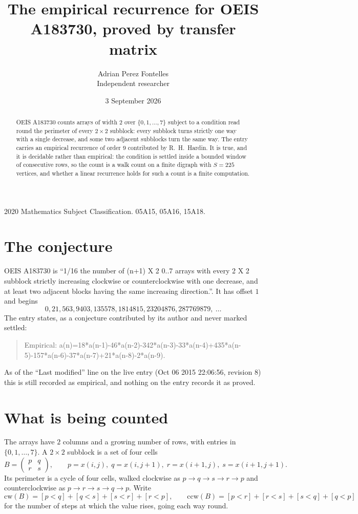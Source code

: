 \documentclass[11pt,a4paper]{article}
\title{The empirical recurrence for OEIS A183730, proved by transfer matrix}
\author{Adrian Perez Fontelles\\ \small Independent researcher}
\date{3 September 2026}
\theoremstyle{plain}
\theoremstyle{definition}
\begin{document}
\maketitle

\begin{abstract}
OEIS A183730 counts arrays of width $2$ over $\{0,1,\dots,7\}$ subject to a condition read round the
perimeter of every $2\times2$ subblock: every subblock turns strictly one way with a single decrease, and some two adjacent subblocks turn the same way. The entry carries an empirical recurrence of
order $9$ contributed by R.~H.~Hardin. It is true, and it is decidable rather than
empirical: the condition is settled inside a bounded window of consecutive rows, so the
count is a walk count on a finite digraph with $S=225$ vertices, and whether a linear
recurrence holds for such a count is a finite computation.
\end{abstract}

\noindent\small 2020 Mathematics Subject Classification. 05A15, 05A16, 15A18.\normalsize

\section{The conjecture}

OEIS A183730 is ``1/16 the number of (n+1) X 2 0..7 arrays with every 2 X 2 subblock strictly increasing clockwise or counterclockwise with one decrease, and at least two adjacent blocks having the same increasing direction.''. It has offset $1$ and begins
\[
0, 21, 563, 9403, 135578, 1814815, 23204876, 287769879,\ \dots
\]
The entry states, as a conjecture contributed by its author and never marked settled:
\begin{quote}
Empirical: a(n)=18*a(n-1)-46*a(n-2)-342*a(n-3)-33*a(n-4)+435*a(n-5)-157*a(n-6)-37*a(n-7)+21*a(n-8)-2*a(n-9).
\end{quote}
As of the ``Last modified'' line on the live entry (Oct 06 2015 22:06:56, revision 8) this is still
recorded as empirical, and nothing on the entry records it as proved.

\section{What is being counted}

The arrays have $2$ columns and a growing number of rows, with entries in $\{0,1,\dots,7\}$. A
$2\times2$ subblock is a set of four cells
\[
B=\begin{pmatrix} p & q \\ r & s \end{pmatrix},
\qquad p=x(i,j),\; q=x(i,j+1),\; r=x(i+1,j),\; s=x(i+1,j+1).
\]
Its perimeter is a cycle of four cells, walked clockwise as $p\to q\to s\to r\to p$ and
counterclockwise as $p\to r\to s\to q\to p$. Write
\[
\mathrm{cw}(B)=[p<q]+[q<s]+[s<r]+[r<p],\qquad
\mathrm{ccw}(B)=[p<r]+[r<s]+[s<q]+[q<p]
\]
for the number of steps at which the value rises, going each way round.
\end{document}
